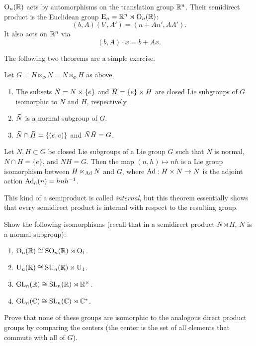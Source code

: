 \begin{example}
    $\operatorname{O}_n(\mathbb{R})$ acts by automorphisms on the translation group $\mathbb{R}^n$. Their semidirect product is the Euclidean group $\mathrm{E}_n=\mathbb{R}^n\rtimes \operatorname{O}_n(\mathbb{R})$:
    \[(b,A)(b',A')=(n+An',AA').\]
    It also acts on $\mathbb{R}^n$ via 
    \[(b,A)\cdot x=b+Ax.\]
\end{example}


The following two theorems are a simple exercise.
\begin{prop}
    Let $G=H\ltimes_\Phi N=N\rtimes_\Phi H$ as above.
    \begin{enumerate}[label=(\alph*)]
        \item The subsets $\wt{N}=N\times\{e\}$ and $\wt{H}=\{e\}\times H$ are closed Lie subgroups of $G$ isomorphic to $N$ and $H$, respectively.
        \item $\wt N$ is a normal subgroup of $G$.
        \item $\wt N\cap \wt H=\{(e,e)\}$ and $\wt{N}\wt{H}=G$.
    \end{enumerate}
\end{prop}

\begin{thm}
    Let $N,H\subset G$ be closed Lie subgroups of a Lie group $G$ such that $N$ is normal, $N\cap H=\{e\}$, and $NH=G$. Then the map $(n,h)\mapsto nh$ is a Lie group isomorphism between $H\ltimes_{\mathrm{Ad}} N$ and $G$, where $\mathrm{Ad}:H\times N\to N$ is the adjoint action $\mathrm{Ad}_h(n)=hnh^{-1}$.
\end{thm}
This kind of a semiproduct is called \emph{internal}, but this theorem essentially shows that every semidirect product is internal with respect to the resulting group.

\begin{xca}
    Show the following isomorphisms (recall that in a semidirect product $N\rtimes H$, $N$ is a normal subgroup):
    \begin{enumerate}[label=(\alph*)]
        \item $\operatorname{O}_n(\mathbb{R})\cong \operatorname{SO}_n(\mathbb{R})\rtimes \operatorname{O}_1$.
        \item $\operatorname{U}_n(\mathbb{R})\cong \operatorname{SU}_n(\mathbb{R})\rtimes \operatorname{U}_1$.
        \item $\operatorname{GL}_n(\mathbb{R})\cong \operatorname{SL}_n(\mathbb{R})\rtimes \mathbb{R}^\times$.
        \item $\operatorname{GL}_n(\mathbb{C})\cong \operatorname{SL}_n(\mathbb{C})\rtimes \mathbb{C}^\ast$.
    \end{enumerate}
    Prove that none of these groups are isomorphic to the analogous direct product groups by comparing the centers (the center is the set of all elements that commute with all of $G$).
\end{xca}



